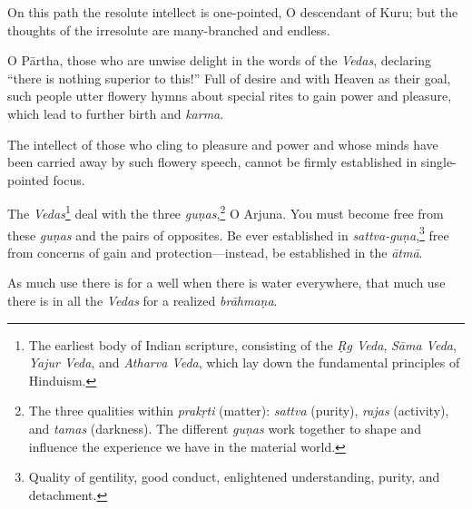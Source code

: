 {On this path the resolute intellect is one-pointed, O descendant of Kuru; but the thoughts of the irresolute are many-branched and endless.}

{O Pārtha, those who are unwise delight in the words of the \textit{Vedas}, declaring \enquote{there is nothing superior to this!} Full of desire and with Heaven as their goal, such people utter flowery hymns about special rites to gain power and pleasure, which lead to further birth and \textit{karma}.}

{The intellect of those who cling to pleasure and power and whose minds have been carried away by such flowery speech, cannot be firmly established in single-pointed focus.}

{The \textit{Vedas}\footnote{The earliest body of Indian scripture, consisting of the \textit{Ṛg Veda}, \textit{Sāma Veda}, \textit{Yajur Veda}, and \textit{Atharva Veda}, which lay down the fundamental principles of Hinduism.} deal with the three \textit{guṇas},\footnote{The three qualities within \textit{prakṛti} (matter): \textit{sattva} (purity), \textit{rajas} (activity), and \textit{tamas} (darkness). The different \textit{guṇas} work together to shape and influence the experience we have in the material world.} O Arjuna. You must become free from these \textit{guṇas} and the pairs of opposites. Be ever established in \textit{sattva-guṇa},\footnote{Quality of gentility, good conduct, enlightened understanding, purity, and detachment.} free from concerns of gain and protection---instead, be established in the \textit{ātmā}.}

{As much use there is for a well when there is water everywhere, that much use there is in all the \textit{Vedas} for a realized \textit{brāhmaṇa}.}

